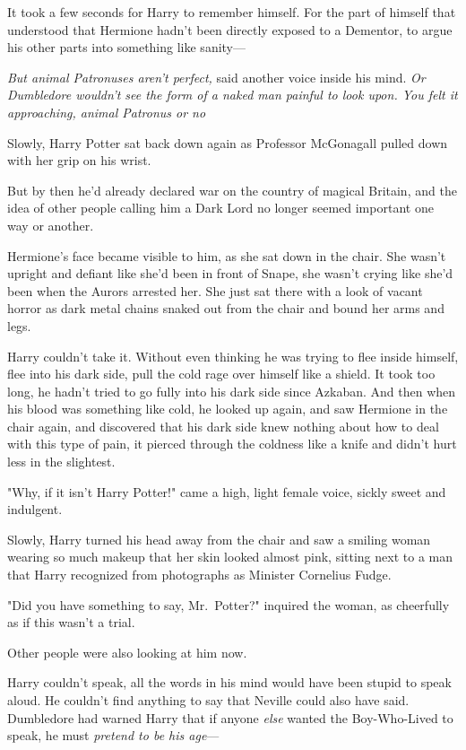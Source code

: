 It took a few seconds for Harry to remember himself. For the part of himself
that understood that Hermione hadn't been directly exposed to a Dementor, to
argue his other parts into something like sanity—

\emph{But animal Patronuses aren't perfect,} said another voice inside his
mind. \emph{Or Dumbledore wouldn't see the form of a naked man painful to look
upon. You felt it approaching, animal Patronus or no{\el}}

Slowly, Harry Potter sat back down again as Professor McGonagall pulled down
with her grip on his wrist.

But by then he'd already declared war on the country of magical Britain, and
the idea of other people calling him a Dark Lord no longer seemed important one
way or another.

Hermione's face became visible to him, as she sat down in the chair. She wasn't
upright and defiant like she'd been in front of Snape, she wasn't crying like
she'd been when the Aurors arrested her. She just sat there with a look of
vacant horror as dark metal chains snaked out from the chair and bound her arms
and legs.

Harry couldn't take it. Without even thinking he was trying to flee inside
himself, flee into his dark side, pull the cold rage over himself like a
shield. It took too long, he hadn't tried to go fully into his dark side since
Azkaban. And then when his blood was something like cold, he looked up again,
and saw Hermione in the chair again, and discovered that his dark side knew
nothing about how to deal with this type of pain, it pierced through the
coldness like a knife and didn't hurt less in the slightest.

"Why, if it isn't Harry Potter!" came a high, light female voice, sickly sweet
and indulgent.

Slowly, Harry turned his head away from the chair and saw a smiling woman
wearing so much makeup that her skin looked almost pink, sitting next to a man
that Harry recognized from photographs as Minister Cornelius Fudge.

"Did you have something to say, Mr.~Potter?" inquired the woman, as cheerfully
as if this wasn't a trial.

Other people were also looking at him now.

Harry couldn't speak, all the words in his mind would have been stupid to speak
aloud. He couldn't find anything to say that Neville could also have said.
Dumbledore had warned Harry that if anyone \emph{else} wanted the Boy-Who-Lived
to speak, he must \emph{pretend to be his age}—


